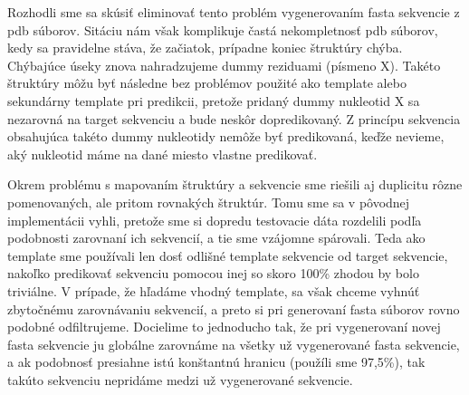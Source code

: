\indent Rozhodli sme sa skúsiť eliminovať tento problém vygenerovaním fasta sekvencie z pdb súborov. Sitáciu nám však komplikuje častá nekompletnosť pdb súborov, kedy sa pravidelne stáva, že začiatok, prípadne koniec štruktúry chýba. Chýbajúce úseky znova nahradzujeme dummy reziduami (písmeno X). Takéto štruktúry môžu byť následne bez problémov použité ako template alebo sekundárny template pri predikcii, pretože pridaný dummy nukleotid X sa nezarovná na target sekvenciu a bude neskôr dopredikovaný. Z princípu sekvencia obsahujúca takéto dummy nukleotidy nemôže byť predikovaná, keďže nevieme, aký nukleotid máme na dané miesto vlastne predikovať.


\indent Okrem problému s mapovaním štruktúry a sekvencie sme riešili aj duplicitu rôzne pomenovaných, ale pritom rovnakých štruktúr. Tomu sme sa v pôvodnej implementácii vyhli, pretože sme si dopredu testovacie dáta rozdelili podľa podobnosti zarovnaní ich sekvencií, a tie sme vzájomne spárovali. Teda ako template sme používali len dosť odlišné template sekvencie od target sekvencie, nakoľko predikovať sekvenciu pomocou inej so skoro 100\% zhodou by bolo triviálne. V prípade, že hľadáme vhodný template, sa však chceme vyhnúť zbytočnému zarovnávaniu sekvencií, a preto si pri generovaní fasta súborov rovno podobné odfiltrujeme. Docielime to jednoducho tak, že pri vygenerovaní novej fasta sekvencie ju globálne zarovnáme na všetky už vygenerované fasta sekvencie, a ak podobnosť presiahne istú konštantnú hranicu (použíli sme 97,5\%), tak takúto sekvenciu nepridáme medzi už vygenerované sekvencie.